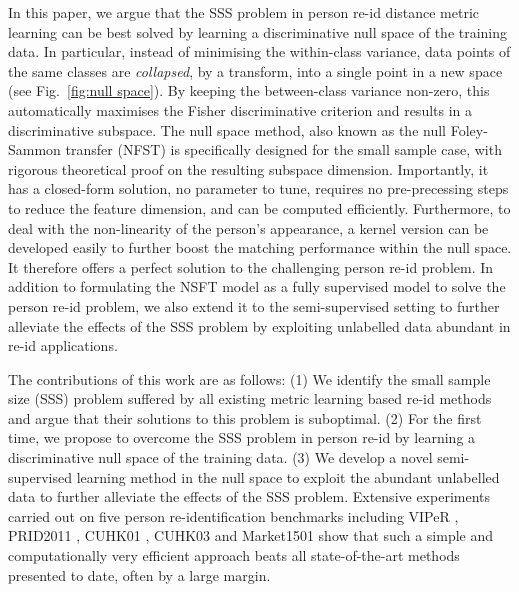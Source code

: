 \documentclass[10pt,twocolumn,letterpaper]{article}
\begin{document}

In this paper, we argue that the SSS problem in person re-id distance metric learning can be best solved by learning a discriminative null space of the training data. In particular, instead of minimising the within-class variance, data points of the same classes are {\em collapsed}, by a transform, into a single point in a new space (see Fig.~\ref{fig:null space}). By keeping the between-class variance non-zero, this automatically maximises the Fisher discriminative criterion and results in a discriminative subspace.  The null space method, also known as the null Foley-Sammon transfer (NFST) \cite{guo2006null} is specifically designed for the small sample case, with rigorous theoretical proof on the resulting subspace dimension. Importantly, it has a closed-form solution, no parameter to tune, requires no pre-precessing steps to reduce the feature dimension, and can be computed efficiently.  Furthermore, to deal with the non-linearity of the person's appearance, a kernel version can be developed easily to further boost the matching performance within the null space. It therefore offers a perfect solution to the challenging person re-id problem. In addition to formulating the NSFT model as a fully supervised model to solve the person re-id problem, we also extend it to the semi-supervised setting to further alleviate the effects of the SSS problem by exploiting unlabelled data abundant in re-id applications.  

The contributions of this work are as follows: (1) We identify the small sample size (SSS) problem suffered by all existing metric learning based re-id methods and argue that their solutions to this problem is suboptimal. (2) For the first time, we propose to overcome the SSS problem in person re-id by learning a discriminative null space of the training data. (3) We  develop a novel semi-supervised learning method in the null space to exploit the abundant unlabelled data to further alleviate the effects of the SSS problem. Extensive experiments carried out on five person re-identification benchmarks including VIPeR \cite{gray2007evaluating}, PRID2011 \cite{hirzer2011person}, CUHK01 \cite{CUHK_dataset}, CUHK03 \cite{CUHK_dataset} and Market1501 \cite{zheng2015scalable} show that such a simple and computationally very efficient approach beats all state-of-the-art methods presented to date, often by a large margin.
\end{document}
